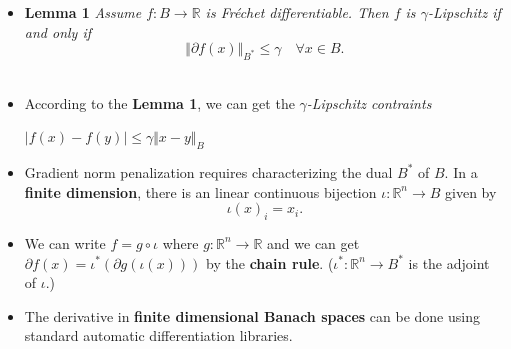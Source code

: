 \documentclass[landscape,headrule,footrule]{foils}
\begin{document}
\begin{frame}
\begin{flushleft}
\begin{itemize}
\item \textbf{Lemma 1}
\textit{Assume $f:B \rightarrow \mathbb{R}$ is Fréchet differentiable. Then $f$ is $\gamma$-Lipschitz if and only if} \\
\begin{equation}
\Vert \partial f(x) \Vert_{B^*} \leq \gamma \quad \forall x \in B.
\end{equation}
 \\
\item According to the \textbf{Lemma 1}, we can get the \textit{$\gamma$-Lipschitz contraints} \\
\begin{center}
$|f(x) - f(y)| \leq \gamma \Vert x-y \Vert_B$ \\
\end{center}
\end{itemize}
\end{flushleft}
\end{frame}

\begin{frame}
\begin{flushleft}
\begin{itemize}
\item Gradient norm penalization requires characterizing the dual $B^*$ of $B$. In a \textbf{finite dimension}, there is an linear continuous bijection $\iota: \mathbb{R}^n \rightarrow B$ given by
\begin{equation}
\iota(x)_i = x_i.
\end{equation}
\item We can write $f = g\circ \iota$  where $g: \mathbb{R}^n \rightarrow \mathbb{R}$ and we can get  $ \partial f(x) = \iota^* (\partial g(\iota(x)))$ by the \textbf{chain rule}.
($\iota^* :\mathbb{R}^n \rightarrow B^*$ is the adjoint of $\iota$.) \\
\item The derivative in \textbf{finite dimensional Banach spaces} can be done using standard automatic differentiation libraries. \\

\end{itemize}
\end{flushleft}
\end{frame}
\end{document}
